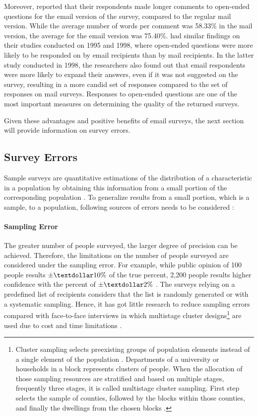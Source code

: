 Moreover, \cite{Paolo2009} reported that their respondents made longer comments to open-ended questions for the email version of the survey, compared to the regular mail version. While the average number of words per comment was 58.33\% in the mail version, the average for the email version was 75.40\%. \cite{BachmannD.ElfrinkJ.&Vazzana1999} had similar findings on their studies conducted on 1995 and 1998, where open-ended questions were more likely to be responded on by email recipients than by mail recipients. In the latter study conducted in 1998, the researchers also found out that email respondents were more likely to expand their answers, even if it was not suggested on the survey, resulting in a more candid set of responses compared to the set of responses on mail surveys. Responses to open-ended questions are one of the most important measures on determining the quality of the returned surveys.
\vspace{1cm}

Given these advantages and positive benefits of email surveys, the next section will provide information on survey errors.

\subsection{Survey Errors}
\label{sec:2.1.2:SurErr}
Sample surveys are quantitative estimations of the distribution of a characteristic in a population by obtaining this information from a small portion of the corresponding population \citep{Dillman1991}. To generalize results from a small portion, which is a sample, to a population, following sources of errors needs to be considered \citetext{\citealp[page 9]{Dillman2006}; \citealp{Dillman1991}}:

\paragraph{Sampling Error}
The greater number of people surveyed, the larger degree of precision can be achieved. Therefore, the limitations on the number of people surveyed are considered under the sampling error. For example, while public opinion of 100 people results \(\pm\textdollar10\%\) of the true percent, 2,200 people results higher confidence with the percent of \(\pm\textdollar2\%\) \citep[page 9]{Dillman2006}. The surveys relying on a predefined list of recipients considers that the list is randomly generated or with a systematic sampling. Hence, it has got little research to reduce sampling errors compared with face-to-face interviews in which multistage cluster designs\footnote{Cluster sampling selects preexisting groups of population elements instead of a single element of the population \citep[page 106]{Groves2009}. Departments of a university or households in a block represents clusters of people. When the allocation of those sampling resources are stratified and based on multiple stages, frequently three stages, it is called multistage cluster sampling. First step selects the sample of counties, followed by the blocks within those counties, and finally the dwellings from the chosen blocks \citep{Scott1969}.} are used due to cost and time limitations \citetext{\citealp[page 106]{Groves2009}; \citealp{Dillman1991}}.

